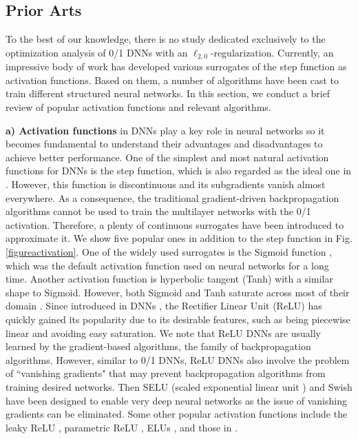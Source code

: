 \documentclass[journal]{IEEEtran}
\begin{document}
\subsection{Prior Arts} \label{Section-relatedlectures}
To the best of our knowledge, there is no study dedicated exclusively to the optimization analysis of 0/1 DNNs with an $\ell_{2,0}$-regularization. Currently, an impressive body of work has developed various surrogates of the step function as  activation functions. Based on them, a number of algorithms have been cast to train different structured neural networks. In this section, we conduct a brief review of  popular activation functions and relevant algorithms.

{\bf a) Activation functions} in DNNs play a key role in neural networks so it becomes fundamental to understand their advantages and disadvantages to achieve better performance. One of the simplest and most natural activation functions for DNNs is the step function, which is also regarded as the ideal one in \cite{zhouzhihua}. However, this function is discontinuous and its subgradients vanish almost everywhere. As a consequence, the traditional gradient-driven backpropagation algorithms \cite{Rumelhart1986} cannot be used to train the multilayer networks with the 0/1 activation. Therefore, a plenty of
continuous surrogates have been introduced to approximate it.  We show five popular ones in addition to the step function in Fig. \ref{figureactivation}. One of the widely used surrogates is the Sigmoid function \cite{Han1995}, which was the default activation function used on neural networks for a long time. Another activation function is hyperbolic tangent (Tanh) with a similar shape to Sigmoid.  However, both Sigmoid and Tanh saturate across most of their domain \cite{Goodfellow2016}.
 Since introduced in DNNs \cite{Nair2012}, the Rectifier Linear Unit (ReLU) has quickly gained its popularity due to its desirable features, such as being piecewise linear and avoiding easy saturation. We note that ReLU DNNs are usually learned by the gradient-based algorithms, the family of backpropagation algorithms. However, similar to 0/1 DNNs, ReLU DNNs also involve the problem of ``vanishing gradients" that may prevent backpropagation algorithms from training desired networks. Then SELU (scaled exponential linear unit \cite{Klambauer2017}) and Swish \cite{Ramachandran2017} have been designed to enable very deep neural networks as the issue of vanishing gradients can be  eliminated. Some other popular activation functions include the leaky ReLU \cite{Maas2013},  parametric ReLU \cite{He2015},  ELUs \cite{Clevert2015}, and those in \cite{Goodfellow2016}.
\end{document}
